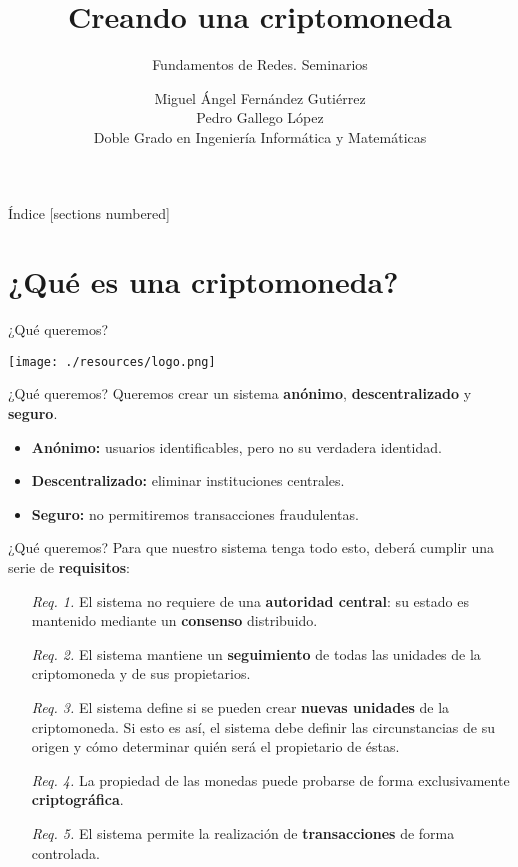 \documentclass[10pt, xcolor=table]{beamer}
\title{Creando una criptomoneda}
\subtitle{Fundamentos de Redes. \alert{Seminarios}}
\date{}
\author{Miguel Ángel Fernández Gutiérrez\\Pedro Gallego López\\[4pt]\footnotesize{Doble Grado en Ingeniería Informática y Matemáticas}}
\begin{document}
\maketitle

\begin{frame}{Índice}
	[sections numbered]
	\tableofcontents[]
\end{frame}

\section{¿Qué es una criptomoneda?}

\begin{frame}[fragile]{¿Qué queremos?}
\begin{center}
	\texttt{[image: ./resources/logo.png]}
\end{center}

\end{frame}

\begin{frame}{¿Qué queremos?}
Queremos crear un sistema \textbf{anónimo}, \textbf{descentralizado} y \textbf{seguro}.
\begin{itemize}
	\item \textbf{Anónimo:} usuarios identificables, pero no su verdadera identidad.
	\item \textbf{Descentralizado:} eliminar instituciones centrales.
	\item \textbf{Seguro:} no permitiremos transacciones fraudulentas.
\end{itemize}
\end{frame}

\begin{frame}{¿Qué queremos?}
Para que nuestro sistema tenga todo esto, deberá cumplir una serie de \textbf{requisitos}:

\hfill\begin{minipage}{1\textwidth}
\begin{enumerate}
\def\labelenumi{\emph{Req. \arabic{enumi}.}}
\itemsep1pt\parskip0pt
\item[\emph{Req. 1.}]
  El sistema no requiere de una \textbf{autoridad central}: su estado es
  mantenido mediante un \textbf{consenso} distribuido.
\item[\emph{Req. 2.}]
  El sistema mantiene un \textbf{seguimiento} de todas las unidades de
  la criptomoneda y de sus propietarios.
\item[\emph{Req. 3.}]
  El sistema define si se pueden crear \textbf{nuevas unidades} de la
  criptomoneda. Si esto es así, el sistema debe definir las
  circunstancias de su origen y cómo determinar quién será el
  propietario de éstas.
\item[\emph{Req. 4.}]
  La propiedad de las monedas puede probarse de forma exclusivamente
  \textbf{criptográfica}.
\item[\emph{Req. 5.}]
  El sistema permite la realización de \textbf{transacciones} de forma
  controlada.
\end{enumerate}
\end{minipage}
\end{frame}
\end{document}
